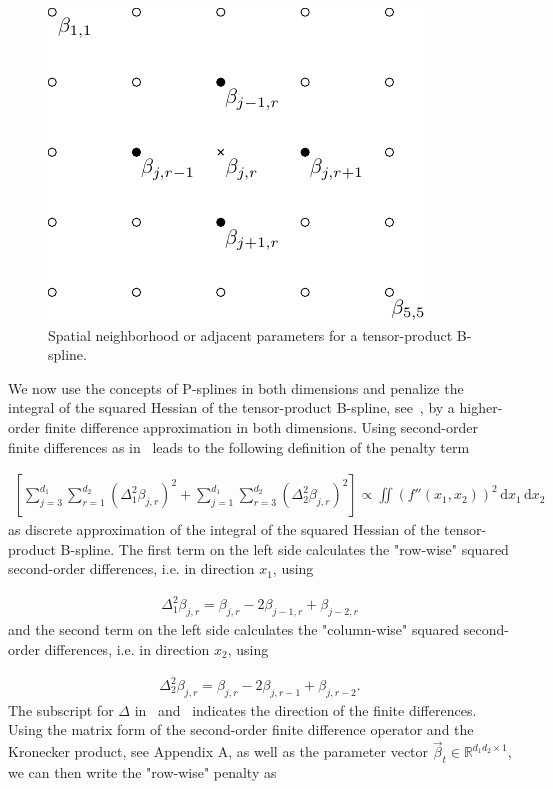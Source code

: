 \begin{figure}[H]
	\centering	
	\includegraphics{graphics/pgfplots/cha2/tps-spatial-neighborhood.pdf}
	\caption{Spatial neighborhood or adjacent parameters for a tensor-product B-spline.}
	\label{fig:tps-neighborhood}
\end{figure}
%
We now use the concepts of P-splines in both dimensions and penalize the integral of the squared Hessian of the tensor-product B-spline, see~, by a higher-order finite difference approximation in both dimensions. Using second-order finite differences as in~ leads to the following definition of the penalty term

\begin{align}
	\left[ \sum_{j=3}^{d_1} \sum_{r=1}^{d_2} (\Delta_1^2 \beta_{j,r})^2 + \sum_{j=1}^{d_1} \sum_{r=3}^{d_2} (\Delta_2^2 \beta_{j,r})^2 \right] \propto \iint \left(f''(x_1, x_2) \right)^2 \,\mathrm{d}x_1 \,\mathrm{d}x_2
\end{align}
%
as discrete approximation of the integral of the squared Hessian of the tensor-product B-spline. The first term on the left side calculates the "row-wise" squared second-order differences, i.e. in direction $x_1$, using

\begin{align} \label{eq:row-wise-diff-operator}
	\Delta_1^2 \beta_{j,r} = \beta_{j,r} - 2\beta_{j-1,r} + \beta_{j-2,r} 
\end{align}
%
and the second term on the left side calculates the "column-wise" squared second-order differences, i.e. in direction $x_2$, using

\begin{align} \label{eq:col-wise-diff-operator}
	\Delta_2^2 \beta_{j,r} = \beta_{j,r} -2\beta_{j,r-1} + \beta_{j,r-2}.
\end{align}
%
The subscript for $\Delta$ in~ and~ indicates the direction of the finite differences. Using the matrix form of the second-order finite difference operator and the Kronecker product, see Appendix A, as well as the parameter vector $\vec{\beta}_t \in \mathbb{R}^{d_1 d_2 \times 1}$, we can then write the "row-wise" penalty as

